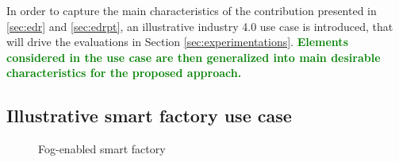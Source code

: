 \documentclass{iosart2c}
\newcommand{\added}[1]{\textcolor{green}{\textbf{#1}}}
\begin{document}
In order to capture the main characteristics of the contribution presented in \textsection \ref{sec:edr} and \textsection \ref{sec:edrpt}, an illustrative industry 4.0 use case is introduced, that will drive the evaluations in Section \textsection \ref{sec:experimentations}.
\added{Elements considered in the use case are then generalized into main desirable characteristics for the proposed approach.}

\subsection{Illustrative smart factory use case}
\label{sec:distribution_use_case}

\begin{figure}
	\centering
	\caption{Fog-enabled smart factory}
	\label{fig:usecase}
\end{figure}
\end{document}

